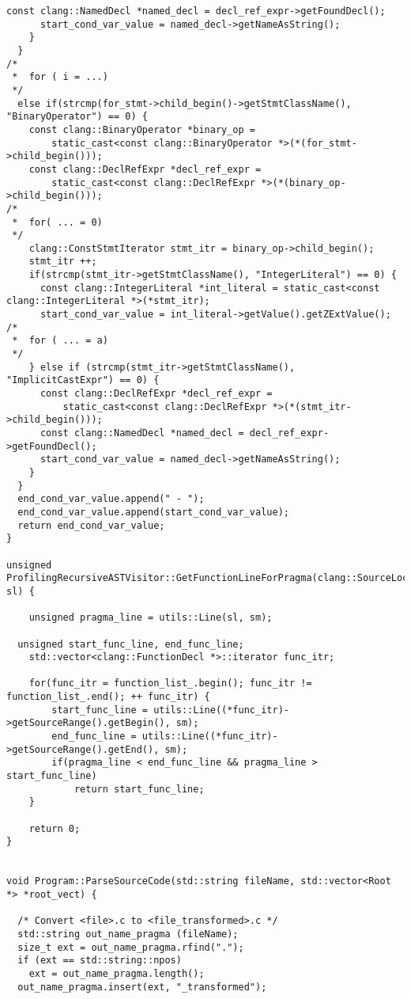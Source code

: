 \documentclass[a4paper,11pt,twoside]{book}
\begin{document}
\begin{lstlisting}[language=CCC, caption=driver/program.cpp]
      const clang::NamedDecl *named_decl = decl_ref_expr->getFoundDecl();
      start_cond_var_value = named_decl->getNameAsString();
    }
  }
/*
 *  for ( i = ...)
 */
  else if(strcmp(for_stmt->child_begin()->getStmtClassName(), "BinaryOperator") == 0) {
    const clang::BinaryOperator *binary_op = 
        static_cast<const clang::BinaryOperator *>(*(for_stmt->child_begin())); 
    const clang::DeclRefExpr *decl_ref_expr = 
        static_cast<const clang::DeclRefExpr *>(*(binary_op->child_begin()));
/*
 *  for( ... = 0)
 */
    clang::ConstStmtIterator stmt_itr = binary_op->child_begin();
    stmt_itr ++;
    if(strcmp(stmt_itr->getStmtClassName(), "IntegerLiteral") == 0) {
      const clang::IntegerLiteral *int_literal = static_cast<const clang::IntegerLiteral *>(*stmt_itr);
      start_cond_var_value = int_literal->getValue().getZExtValue();      
/*
 *  for ( ... = a)
 */
    } else if (strcmp(stmt_itr->getStmtClassName(), "ImplicitCastExpr") == 0) {
      const clang::DeclRefExpr *decl_ref_expr = 
          static_cast<const clang::DeclRefExpr *>(*(stmt_itr->child_begin()));
      const clang::NamedDecl *named_decl = decl_ref_expr->getFoundDecl();
      start_cond_var_value = named_decl->getNameAsString();
    }
  }
  end_cond_var_value.append(" - ");
  end_cond_var_value.append(start_cond_var_value);
  return end_cond_var_value;
}

unsigned ProfilingRecursiveASTVisitor::GetFunctionLineForPragma(clang::SourceLocation sl) {

	unsigned pragma_line = utils::Line(sl, sm);

  unsigned start_func_line, end_func_line;
	std::vector<clang::FunctionDecl *>::iterator func_itr;

	for(func_itr = function_list_.begin(); func_itr != function_list_.end(); ++ func_itr) {
		start_func_line = utils::Line((*func_itr)->getSourceRange().getBegin(), sm);
		end_func_line = utils::Line((*func_itr)->getSourceRange().getEnd(), sm);
		if(pragma_line < end_func_line && pragma_line > start_func_line)
			return start_func_line;
	}

	return 0;
}


void Program::ParseSourceCode(std::string fileName, std::vector<Root *> *root_vect) {

  /* Convert <file>.c to <file_transformed>.c */
  std::string out_name_pragma (fileName);
  size_t ext = out_name_pragma.rfind(".");
  if (ext == std::string::npos)
    ext = out_name_pragma.length();
  out_name_pragma.insert(ext, "_transformed");


\end{lstlisting}
\end{document}

